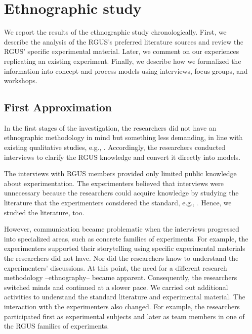 \section{Ethnographic study}\label{sec-reseach-execution}
We report the results of the ethnographic study chronologically. First, we describe the analysis of the RGUS's preferred literature sources and review the RGUS' specific experimental material. Later, we comment on our experiences replicating an existing experiment. Finally, we describe how we formalized the information into concept and process models using interviews, focus groups, and workshops.

\subsection{First Approximation}
In the first stages of the investigation, the researchers did not have an ethnographic methodology in mind but something less demanding, in line with existing qualitative studies, e.g., \cite{Johanssen-2019-Continuous-SE-support,Strandberg-2019-Ethical-Interviews-SE,Yang-2021-interview-study-developers,modi2023using,runeson2020challenges}. Accordingly, the researchers conducted interviews to clarify the RGUS knowledge and convert it directly into models. 

The interviews with RGUS members provided only limited public knowledge about experimentation. The experimenters believed that interviews were unnecessary because the researchers could acquire knowledge by studying the literature that the experimenters considered the standard, e.g., \cite{Wohlin-2000-Experimentation-SE}. Hence, we studied the literature, too.

However, communication became problematic when the interviews progressed into specialized areas, such as concrete families of experiments. For example, the experimenters supported their storytelling using specific experimental materials the researchers did not have. Nor did the researchers know to understand the experimenters' discussions. At this point, the need for a different research methodology --ethnography-- became apparent. Consequently, the researchers switched minds and continued at a slower pace. We carried out additional activities to understand the standard literature and experimental material. The interaction with the experimenters also changed. For example, the researchers participated first as experimental subjects and later as team members in one of the RGUS families of experiments.

